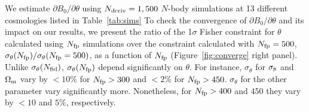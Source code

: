We estimate $\partial B_0/\partial \theta$ using $N_{\rm deriv} = 1,500$ 
$N$-body simulations at 13 different cosmologies listed in Table~\ref{tab:sims} 
To check the convergence of $\partial B_0/\partial \theta$ and its impact on our 
results, we present the ratio of the 1$\sigma$ Fisher constraint for $\theta$ calculated 
using $N_{\rm fp}$ simulations over the constraint calculated with $N_{\rm fp} = 500$, 
$\sigma_\theta(N_{\rm fp})/\sigma_\theta(N_{\rm fp} = 500)$, as a function of 
$N_{\rm fp}$ (Figure~\ref{fig:converge} right panel). Unlike $\sigma_\theta(N_{\rm fid})$, 
$\sigma_\theta(N_{\rm fp})$ depend significantly on $\theta$. For instance, 
$\sigma_\theta$ for $\sigma_8$ and $\Omega_{\rm m}$ vary by $< 10\%$ for $N_{\rm fp} > 300$ 
and $< 2\%$ for $N_{\rm fp} > 450$. $\sigma_\theta$ for the other parameter 
vary significantly more. Nonetheless, for $N_{\rm fp} > 400$ and $450$ they vary by 
$< 10$ and $5\%$, respectively. 

